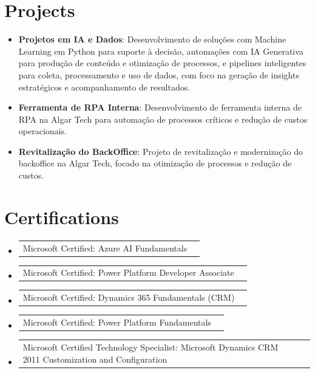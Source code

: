 \documentclass[a4paper,11pt]{article}
\makeatletter
\newcommand{\resumeItem}[1]{
  \item\small{
    {#1 \vspace{-2pt}}
  }
}
\newcommand{\resumeCertification}[2]{%
  \item
  \begin{tabular*}{0.97\textwidth}{@{}l@{\extracolsep{\fill}}r@{}}
    #1 & \text{#2} \\
  \end{tabular*}\vspace{-4pt}
}
\newcommand{\resumeSubItem}[2]{\resumeItem{#1: #2}\vspace{-4pt}}
\newcommand{\resumeSubHeadingListStart}{\begin{itemize}[leftmargin=0em, itemindent=0em, label={}, itemsep=0ex]}
\newcommand{\resumeSubHeadingListEnd}{\end{itemize}}
\makeatother
\begin{document}
\section{Projects}
\resumeSubHeadingListStart
\resumeSubItem{\textbf{Projetos em IA e Dados}}{Desenvolvimento de soluções com Machine Learning em Python para suporte à decisão, automações com IA Generativa para produção de conteúdo e otimização de processos, e pipelines inteligentes para coleta, processamento e uso de dados, com foco na geração de insights estratégicos e acompanhamento de resultados.}
\resumeSubItem{\textbf{Ferramenta de RPA Interna}}{Desenvolvimento de ferramenta interna de RPA na Algar Tech para automação de processos críticos e redução de custos operacionais.}
\resumeSubItem{\textbf{Revitalização do BackOffice}}{Projeto de revitalização e modernização do backoffice na Algar Tech, focado na otimização de processos e redução de custos.}
\resumeSubHeadingListEnd

\section{Certifications}
\resumeSubHeadingListStart
\resumeCertification{Microsoft Certified: Azure AI Fundamentals}{2025}{}{}
\resumeCertification{Microsoft Certified: Power Platform Developer Associate}{2025}{}{}
\resumeCertification{Microsoft Certified: Dynamics 365 Fundamentals (CRM)}{2023}{}{}
\resumeCertification{Microsoft Certified: Power Platform Fundamentals}{2023}{}{}
\resumeCertification{Microsoft Certified Technology Specialist: Microsoft Dynamics CRM 2011 Customization and Configuration}{2013}{}{}
\resumeSubHeadingListEnd
\end{document}
